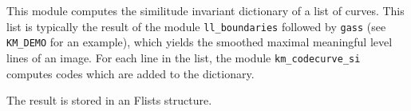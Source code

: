 This module computes the similitude invariant dictionary of a list of curves. 
This list is typically the result of the module \verb+ll_boundaries+ 
followed by \verb+gass+ (see \verb+KM_DEMO+ for an example), 
which yields the smoothed maximal meaningful 
level lines of an image. For each line in the list, the module 
\verb?km_codecurve_si? computes codes which are added to the dictionary.

\medskip

The result is stored in an Flists structure.


